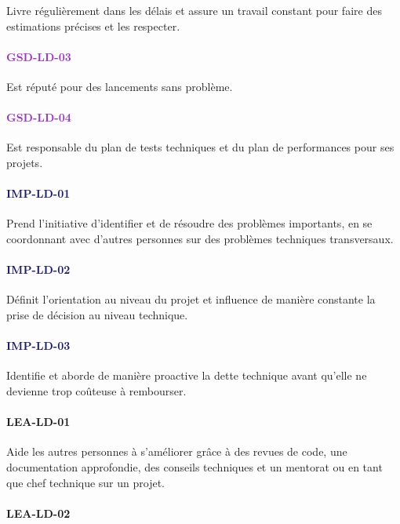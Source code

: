 \documentclass[a4paper, french, openany, 12pt]{book}
\newcommand\str[1]{\textcolor{DarkOrchid}{\textbf{\uppercase{gsd-{#1}}}}}
\newcommand\wis[1]{\textcolor{MidnightBlue}{\textbf{\uppercase{imp-{#1}}}}}
\newcommand\cha[1]{\textcolor{OliveGreen}{\textbf{\uppercase{lea-{#1}}}}}
\begin{document}
\begin{multicols}{2}
  Livre régulièrement dans les délais et assure un travail constant pour faire des estimations précises et les
  respecter.

  \paragraph*{\str{ld-03}}

  Est réputé pour des lancements sans problème.

  \paragraph*{\str{ld-04}}

  Est responsable du plan de tests techniques et du plan de performances pour ses projets.

  \paragraph*{\wis{ld-01}}

  Prend l'initiative d'identifier et de résoudre des problèmes importants, en se coordonnant avec d'autres personnes sur
  des problèmes techniques transversaux.

  \paragraph*{\wis{ld-02}}

  Définit l'orientation au niveau du projet et influence de manière constante la prise de décision au niveau
  technique.
  \paragraph*{\wis{ld-03}}

  Identifie et aborde de manière proactive la dette technique avant qu'elle ne devienne trop coûteuse à rembourser.

  \paragraph*{\cha{ld-01}}

  Aide les autres personnes à s'améliorer grâce à des revues de code, une documentation approfondie, des conseils
  techniques et un mentorat ou en tant que chef technique sur un projet.

  \paragraph*{\cha{ld-02}}


\end{multicols}
\end{document}
